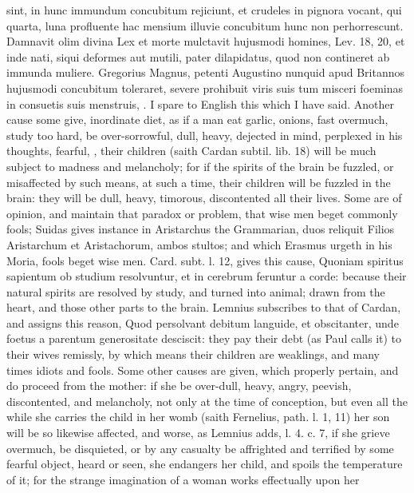 {sint, in hunc immundum concubitum rejiciunt, et crudeles in pignora
vocant, qui quarta, luna profluente hac mensium illuvie concubitum hunc
non perhorrescunt. Damnavit olim divina Lex et morte mulctavit
hujusmodi homines, Lev. 18, 20, et inde nati, siqui deformes aut
mutili, pater dilapidatus, quod non contineret ab  immunda
muliere. Gregorius Magnus, petenti Augustino nunquid apud
Britannos hujusmodi concubitum toleraret, severe prohibuit viris
suis tum misceri foeminas in consuetis suis menstruis, \etc{}. I spare to
English this which I have said. Another cause some give, inordinate
diet, as if a man eat garlic, onions, fast overmuch, study too hard, be
over-sorrowful, dull, heavy, dejected in mind, perplexed in his
thoughts, fearful, \etc{}, their children (saith Cardan subtil. lib.
18) will be much subject to madness and melancholy; for if the spirits
of the brain be fuzzled, or misaffected by such means, at such a time,
their children will be fuzzled in the brain: they will be dull, heavy,
timorous, discontented all their lives. Some are of opinion, and
maintain that paradox or problem, that wise men beget commonly fools;
Suidas gives instance in Aristarchus the Grammarian, duos reliquit
Filios Aristarchum et Aristachorum, ambos stultos; and which
Erasmus urgeth in his Moria, fools beget wise men. Card. subt. l.
12, gives this cause, Quoniam spiritus sapientum ob studium
resolvuntur, et in cerebrum feruntur a corde: because their natural
spirits are resolved by study, and turned into animal; drawn from the
heart, and those other parts to the brain. Lemnius subscribes to that
of Cardan, and assigns this reason, Quod persolvant debitum languide,
et obscitanter, unde foetus a parentum generositate desciscit: they pay
their debt (as Paul calls it) to their wives remissly, by which means
their children are weaklings, and many times idiots and fools.
Some other causes are given, which properly pertain, and do proceed
from the mother: if she be over-dull, heavy, angry, peevish,
discontented, and melancholy, not only at the time of conception, but
even all the while she carries the child in her womb (saith Fernelius,
path. l. 1, 11) her son will be so likewise affected, and worse, as
Lemnius adds, l. 4. c. 7, if she grieve overmuch, be disquieted,
or by any casualty be affrighted and terrified by some fearful object,
heard or seen, she endangers her child, and spoils the temperature of
it; for the strange imagination of a woman works effectually upon her
}
